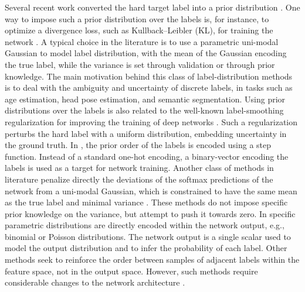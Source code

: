 \documentclass[8pt]{article}
\theoremstyle{definition}
\begin{document}
Several recent work converted the hard target label into a prior distribution \citep{gao2017deep,geng2016label,geng2013facial,huo2016deep}.
One way to impose such a prior distribution over the labels is, for instance, to optimize a divergence loss, such as Kullback–Leibler (KL), for training the network \citep{geng2016label}. A typical choice in the literature is to use a parametric uni-modal Gaussian to model label distribution, with the mean of the Gaussian encoding the true label, while the variance is set through validation or through prior knowledge. The main motivation behind this class of label-distribution methods is to deal with the ambiguity and uncertainty of discrete labels, in tasks such as age estimation, head pose estimation, and semantic segmentation. Using prior distributions over the labels is also related to the well-known label-smoothing regularization for improving the training of deep networks \citep{szegedy2016rethinking}. Such a regularization perturbs the hard label with a uniform distribution, embedding uncertainty in the ground truth. In \citep{cheng2008neural}, the prior order of the labels is encoded using a step function. Instead of a standard one-hot encoding, a binary-vector encoding the labels is used as a target for network training. Another class of methods in literature penalize directly the deviations of the softmax predictions of the network from a uni-modal Gaussian, which is constrained to have the same mean as the true label and minimal variance \citep{beckham2016simple,pan2018mean}. These methods do not impose specific prior knowledge on the variance, but attempt to push it towards zero. In \citep{beckham2017unimodal,da2005classification} specific parametric distributions are directly encoded within the network output, e.g., binomial or Poisson distributions. The network output is a single scalar used to model the output distribution and to infer the probability of each label. Other methods \citep{liu2018constrained,xia2007recursive} seek to reinforce the order between samples of adjacent labels within the feature space, not in the output space. However, such methods require considerable changes to the network architecture \citep{liu2018constrained}.
\end{document}
